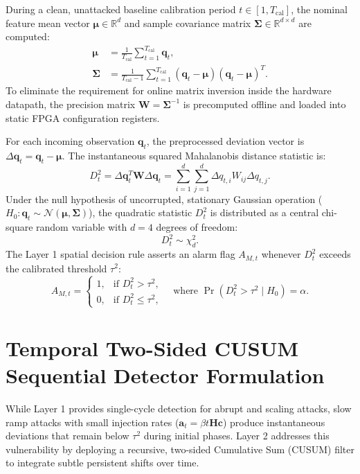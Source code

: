 \documentclass[11pt,a4paper]{report}
\begin{document}
During a clean, unattacked baseline calibration period $t \in [1, T_{\text{cal}}]$, the nominal
feature mean vector $\boldsymbol{\mu} \in \mathbb{R}^d$ and sample covariance matrix
$\boldsymbol{\Sigma} \in \mathbb{R}^{d \times d}$ are computed:
\begin{align}
\boldsymbol{\mu} &= \frac{1}{T_{\text{cal}}} \sum_{t=1}^{T_{\text{cal}}} \boldsymbol{q}_t, \label{eq:ch3_mean_est} \\
\boldsymbol{\Sigma} &= \frac{1}{T_{\text{cal}} - 1} \sum_{t=1}^{T_{\text{cal}}} (\boldsymbol{q}_t - \boldsymbol{\mu})(\boldsymbol{q}_t - \boldsymbol{\mu})^T. \label{eq:ch3_cov_est}
\end{align}
To eliminate the requirement for online matrix inversion inside the hardware datapath, the
precision matrix $\boldsymbol{W} = \boldsymbol{\Sigma}^{-1}$ is precomputed offline and loaded
into static FPGA configuration registers.

For each incoming observation $\boldsymbol{q}_t$, the preprocessed deviation vector is
$\Delta\boldsymbol{q}_t = \boldsymbol{q}_t - \boldsymbol{\mu}$. The instantaneous squared
Mahalanobis distance statistic is:
\begin{equation}
D_t^2 = \Delta\boldsymbol{q}_t^T \boldsymbol{W} \Delta\boldsymbol{q}_t = \sum_{i=1}^d \sum_{j=1}^d \Delta q_{t,i} W_{ij} \Delta q_{t,j}.
\label{eq:ch3_mahal_stat}
\end{equation}
Under the null hypothesis of uncorrupted, stationary Gaussian operation ($H_0: \boldsymbol{q}_t \sim \mathcal{N}(\boldsymbol{\mu}, \boldsymbol{\Sigma})$),
the quadratic statistic $D_t^2$ is distributed as a central chi-square random variable with
$d = 4$ degrees of freedom:
\begin{equation}
D_t^2 \sim \chi^2_d.
\end{equation}
The Layer 1 spatial decision rule asserts an alarm flag $A_{M,t}$ whenever $D_t^2$ exceeds
the calibrated threshold $\tau^2$:
\begin{equation}
A_{M,t} = \begin{cases}
1, & \text{if } D_t^2 > \tau^2, \\
0, & \text{if } D_t^2 \le \tau^2,
\end{cases}
\quad \text{where } \Pr(D_t^2 > \tau^2 \mid H_0) = \alpha.
\label{eq:ch3_layer1_decision}
\end{equation}

\section{Temporal Two-Sided CUSUM Sequential Detector Formulation}
While Layer 1 provides single-cycle detection for abrupt and scaling attacks, slow ramp
attacks with small injection rates ($\boldsymbol{a}_t = \beta t \boldsymbol{H}\boldsymbol{c}$)
produce instantaneous deviations that remain below $\tau^2$ during initial phases.
Layer 2 addresses this vulnerability by deploying a recursive, two-sided Cumulative Sum
(CUSUM) filter to integrate subtle persistent shifts over time.
\end{document}
